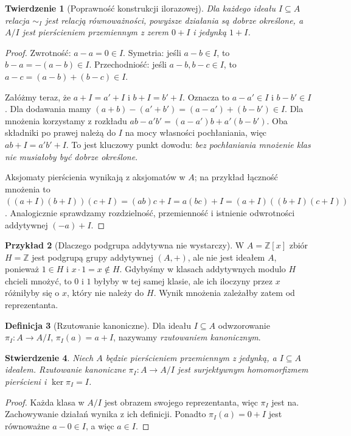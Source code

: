 \documentclass[11pt,a4paper,openany]{report}
\numberwithin{equation}{section}
\theoremstyle{plain}
\newtheorem{twierdzenie}{Twierdzenie}[section]
\newtheorem{stwierdzenie}[twierdzenie]{Stwierdzenie}
\theoremstyle{definition}
\newtheorem{definicja}[twierdzenie]{Definicja}
\newtheorem{przyklad}[twierdzenie]{Przykład}
\theoremstyle{remark}
\newcommand{\Z}{\mathbb Z}
\newcommand{\kerf}{\operatorname{ker}}
\begin{document}
\begin{twierdzenie}[Poprawność konstrukcji ilorazowej]
\label{tw:iloraz}
Dla każdego ideału $I\subseteq A$ relacja $\sim_I$ jest relacją
równoważności, powyższe działania są dobrze określone,
a $A/I$ jest pierścieniem przemiennym z zerem $0+I$
i jedynką $1+I$.
\end{twierdzenie}
\begin{proof}
Zwrotność: $a-a=0\in I$.
Symetria: jeśli $a-b\in I$, to $b-a=-(a-b)\in I$.
Przechodniość: jeśli $a-b,b-c\in I$, to
$a-c=(a-b)+(b-c)\in I$.

Załóżmy teraz, że $a+I=a'+I$ i $b+I=b'+I$.
Oznacza to $a-a'\in I$ i $b-b'\in I$.
Dla dodawania mamy
$(a+b)-(a'+b')=(a-a')+(b-b')\in I$.
Dla mnożenia korzystamy z rozkładu
$ab-a'b'=(a-a')b+a'(b-b')$.
Oba składniki po prawej należą do $I$ na mocy własności pochłaniania,
więc $ab+I=a'b'+I$. To jest kluczowy punkt dowodu:
\emph{bez pochłaniania mnożenie klas nie musiałoby być dobrze określone}.

Aksjomaty pierścienia wynikają z aksjomatów w $A$;
na przykład łączność mnożenia to
$((a+I)(b+I))(c+I)=(ab)c+I=a(bc)+I
=(a+I)((b+I)(c+I))$.
Analogicznie sprawdzamy rozdzielność, przemienność i istnienie
odwrotności addytywnej $(-a)+I$.
\end{proof}

\begin{przyklad}[Dlaczego podgrupa addytywna nie wystarczy]
W $A=\Z[x]$ zbiór $H=\Z$ jest podgrupą grupy addytywnej $(A,+)$,
ale nie jest ideałem $A$, ponieważ $1\in H$ i $x\cdot1=x\notin H$.
Gdybyśmy w klasach addytywnych modulo $H$ chcieli mnożyć,
to $0$ i $1$ byłyby w tej samej klasie, ale ich iloczyny przez $x$
różniłyby się o $x$, który nie należy do $H$.
Wynik mnożenia zależałby zatem od reprezentanta.
\end{przyklad}

\begin{definicja}[Rzutowanie kanoniczne]
Dla ideału $I\subseteq A$ odwzorowanie
$\pi_I\colon A\to A/I$, $\pi_I(a)=a+I$,
nazywamy \emph{rzutowaniem kanonicznym}.
\end{definicja}

\begin{stwierdzenie}
Niech $A$ będzie pierścieniem przemiennym z jedynką, a $I\subseteq A$
ideałem. Rzutowanie kanoniczne $\pi_I:A\to A/I$ jest
surjektywnym homomorfizmem pierścieni i $\kerf\pi_I=I$.
\end{stwierdzenie}
\begin{proof}
Każda klasa w $A/I$ jest obrazem swojego reprezentanta,
więc $\pi_I$ jest na. Zachowywanie działań wynika z ich definicji.
Ponadto $\pi_I(a)=0+I$ jest równoważne $a-0\in I$,
a więc $a\in I$.
\end{proof}
\end{document}
